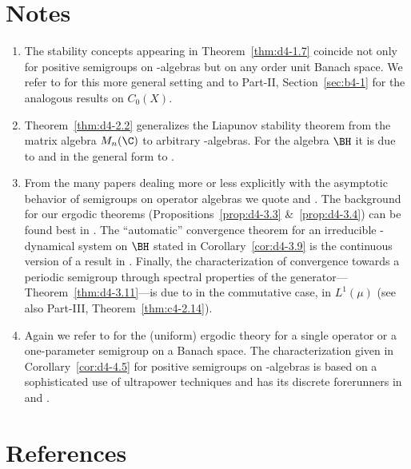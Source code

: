 \section*{Notes}\label{notes:d4-notes}
\begin{enumerate}[label=\emph{Section \arabic*:}, wide, itemsep=1ex]
\item
The stability concepts appearing in Theorem~\ref{thm:d4-1.7} coincide not only for positive semigroups on \CA-algebras but on any order unit Banach space.
We refer to \textcite{battyrobinson:1984} for this more general setting and to Part-II, Section~\ref{sec:b4-1} for the analogous results on $ C_{0}(X) $.


\item
Theorem~\ref{thm:d4-2.2} generalizes the Liapunov stability theorem from the matrix algebra $ M_{n}(\C) $  to arbitrary \WA-algebras.
For the algebra $ \BH $  it is due to \textcite{milstein:1975} and in the general form to \textcite{grohneubrander:1981}.


\item
From the many papers dealing more or less explicitly with the asymptotic behavior of semigroups on operator algebras we quote \textcite{frigerioverri:1982} and \textcite{watanabe:1982}.
The background for our ergodic theorems (Propositions~\ref{prop:d4-3.3} \&~\ref{prop:d4-3.4}) can be found best in \textcite{krengel:1985}.
The \enquote{automatic} convergence theorem for an irreducible \WA-dynamical system on $ \BH $  stated in Corollary~\ref{cor:d4-3.9} is the continuous version of a result in \textcite{groh:1984c}.
Finally, the characterization of convergence towards a periodic semigroup through spectral properties of the generator---Theorem~\ref{thm:d4-3.11}---is due to \textcite{nagel:1984} in the commutative case, \ie in $ L^{1}(\mu) $ (see also Part-III, Theorem~\ref{thm:c4-2.14}).

\item
Again we refer to \textcite{krengel:1985} for the (uniform) ergodic theory for a single operator or a one-parameter semigroup on a Banach space.
The characterization given in Corollary~\ref{cor:d4-4.5} for positive semigroups on \WA-algebras is based on a sophisticated use of ultrapower techniques and has its discrete forerunners in \textcite{lotz:1981} and 
\textcite{groh:1984b}.
\end{enumerate}
\section*{References}
{\RaggedRight
  \printbibliography[heading=none]
 }

